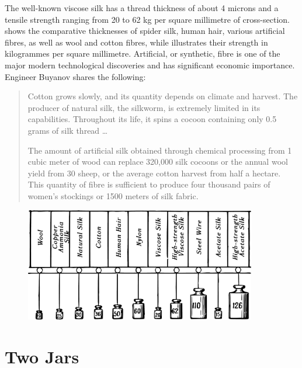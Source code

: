 The well-known viscose silk has a thread thickness of about 4 microns and a tensile strength ranging from 20 to 62 kg per square millimetre of cross-section.  shows the comparative thicknesses of spider silk, human hair, various artificial fibres, as well as wool and cotton fibres, while  illustrates their strength in kilogrammes per square millimetre. Artificial, or synthetic, fibre is one of the major modern technological discoveries and has significant economic importance. Engineer Buyanov shares the following:
\begin{quote}
Cotton grows slowly, and its quantity depends on climate and harvest. The producer of natural silk, the silkworm, is extremely limited in its capabilities. Throughout its life, it spins a cocoon containing only 0.5 grams of silk thread \dots{}

The amount of artificial silk obtained through chemical processing from 1 cubic meter of wood can replace 320,000 silk cocoons or the annual wool yield from 30 sheep, or the average cotton harvest from half a hectare. This quantity of fibre is sufficient to produce four thousand pairs of women's stockings or 1500 meters of silk fabric.
\end{quote}
\begin{figure}[h!]
\centering
\includegraphics[width=0.9\textwidth]{figures/ch-11/fig-164a.pdf}
\end{figure}





\section{Two Jars}
\label{sec-11.4}

